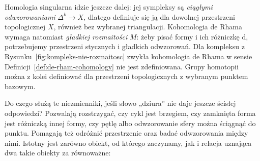 \documentclass[11pt,a4paper,oneside]{report}
\newcommand{\dd}{\mathrm d}
\theoremstyle{plain}
\theoremstyle{definition}
\theoremstyle{remark}
\begin{document}
Homologia singularna idzie jeszcze dalej: jej
sympleksy są \emph{ciągłymi odwzorowaniami}
$\Delta^k\to X$, dlatego definiuje się ją
dla dowolnej przestrzeni topologicznej $X$,
również bez wybranej triangulacji. Kohomologia
de Rhama wymaga natomiast \emph{gładkiej
rozmaitości} $M$: żeby pisać formy i ich
różniczkę $\dd$, potrzebujemy przestrzeni
stycznych i gładkich odwzorowań. Dla kompleksu
z Rysunku~\ref{fig:kompleks-nie-rozmaitosc}
zwykła kohomologia de Rhama w sensie
Definicji~\ref{def:de-rham-cohomology}
nie jest zdefiniowana. Grupy homotopii
można z kolei definiować dla przestrzeni
topologicznych z wybranym punktem bazowym.

Do czego służą te niezmienniki, jeśli słowo
„dziura” nie daje jeszcze ścisłej odpowiedzi?
Pozwalają rozstrzygać, czy cykl jest brzegiem,
czy zamknięta forma jest różniczką innej formy,
czy pętlę albo odwzorowanie sfery można
ściągnąć do punktu. Pomagają też odróżnić
przestrzenie oraz badać odwzorowania między nimi.
Istotny jest zarówno obiekt, od którego
zaczynamy, jak i relacja uznająca dwa takie
obiekty za równoważne:
\end{document}
